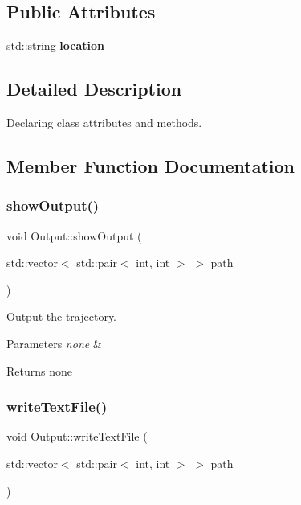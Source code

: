 \subsection*{Public Attributes}
\begin{DoxyCompactItemize}
\item 
\mbox{\label{classOutput_a305c5e08def625bb5a41e1008ed9dcee}} 
std\+::string {\bfseries location}
\end{DoxyCompactItemize}


\subsection{Detailed Description}
Declaring class attributes and methods. 

\subsection{Member Function Documentation}
\mbox{\label{classOutput_af2c30cc4a32305648f5a00435250c80a}} 
\subsubsection{\texorpdfstring{show\+Output()}{showOutput()}}
{\footnotesize\ttfamily void Output\+::show\+Output (\begin{DoxyParamCaption}\item[{std\+::vector$<$ std\+::pair$<$ int, int $>$ $>$}]{path }\end{DoxyParamCaption})}



\mbox{\hyperlink{classOutput}{Output}} the trajectory. 


\begin{DoxyParams}{Parameters}
{\em none} & \\
\hline
\end{DoxyParams}
\begin{DoxyReturn}{Returns}
none 
\end{DoxyReturn}
\mbox{\label{classOutput_a20cb54a07125bf00008407b9435af331}} 
\subsubsection{\texorpdfstring{write\+Text\+File()}{writeTextFile()}}
{\footnotesize\ttfamily void Output\+::write\+Text\+File (\begin{DoxyParamCaption}\item[{std\+::vector$<$ std\+::pair$<$ int, int $>$ $>$}]{path }\end{DoxyParamCaption})}



